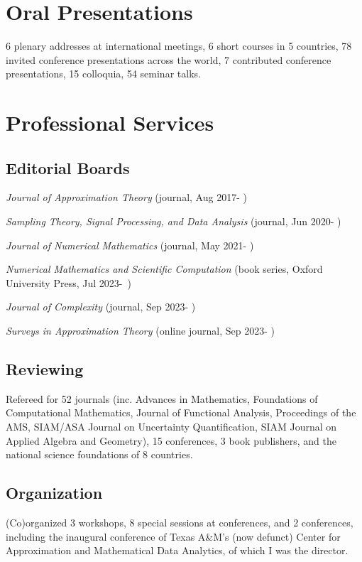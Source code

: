 \documentclass[11pt]{article}
\begin{document}
	
\section{Oral Presentations}


6 plenary addresses at international meetings,
6 short courses in 5 countries,
78 invited conference presentations across the world,
7 contributed conference presentations,
15 colloquia,
54 seminar talks.



\section{Professional Services}

\subsection{Editorial Boards}

\bitemize
\item
{\sl Journal of Approximation Theory} (journal, Aug 2017- )
\item
{\sl Sampling Theory, Signal Processing, and Data Analysis} (journal, Jun 2020- )
\item
{\sl Journal of Numerical Mathematics} (journal, May 2021- )
\item 
{\em Numerical Mathematics and Scientific Computation} (book series, Oxford University Press, Jul 2023-~)
\item
{\sl Journal of Complexity} (journal, Sep 2023- )
\item 
{\sl Surveys in Approximation Theory} (online journal, Sep 2023- )
\eitemize

 
\subsection{Reviewing}

Refereed for 52 journals 
(inc. Advances in Mathematics, 
Foundations of Computational Mathematics, 
Journal of Functional Analysis, 
Proceedings of the AMS,
SIAM/ASA Journal on Uncertainty Quantification,
SIAM Journal on Applied Algebra and Geometry),
 15 conferences, 
 3 book publishers,
and the national science foundations of 8 countries.



\subsection{Organization}

(Co)organized 3 workshops,
8 special sessions at conferences,
and 2 conferences, including the inaugural conference of Texas A\&M's (now defunct) Center for Approximation and Mathematical Data Analytics, of which I was the director.
\end{document}
